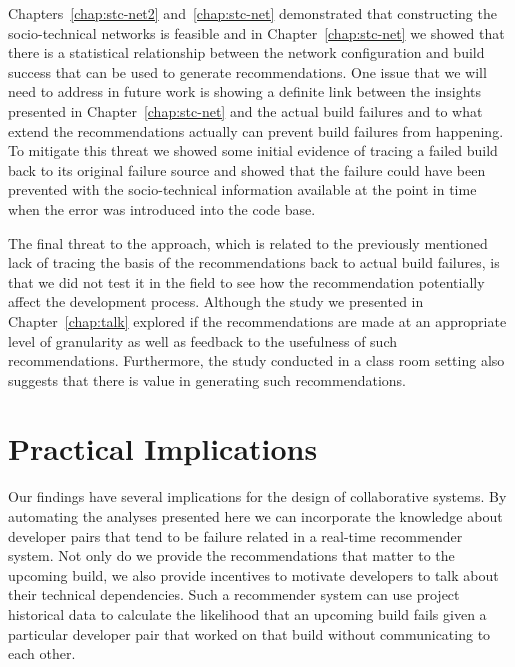 Chapters~\ref{chap:stc-net2} and~\ref{chap:stc-net} demonstrated that constructing the socio-technical networks is feasible and in Chapter~\ref{chap:stc-net} we showed that there is a statistical relationship between the network configuration and build success that can be used to generate recommendations.
One issue that we will need to address in future work is showing a definite link between the insights presented in Chapter~\ref{chap:stc-net} and the actual build failures and to what extend the recommendations actually can prevent build failures from happening.
To mitigate this threat we showed some initial evidence of tracing a failed build back to its original failure source and showed that the failure could have been prevented with the socio-technical information available at the point in time when the error was introduced into the code base.

The final threat to the approach, which is related to the previously mentioned lack of tracing the basis of the recommendations back to actual build failures, is that we did not test it in the field to see how the recommendation potentially affect the development process.
Although the study we presented in Chapter~\ref{chap:talk} explored if the recommendations are made at an appropriate level of granularity as well as feedback to the usefulness of such recommendations.
Furthermore, the study conducted in a class room setting also suggests that there is value in generating such recommendations.

\section{Practical Implications}
\label{sec:implications}
Our findings have several implications for the design of collaborative systems.
By automating the analyses presented here we can incorporate the knowledge about
developer pairs that tend to be failure related in a real-time recommender
system. Not only do we provide the recommendations that matter to the upcoming
build, we also provide incentives to motivate developers to talk about their
technical dependencies. 
%
Such a recommender system can use project historical data to
calculate the likelihood that an upcoming build fails given a particular
developer pair that worked on that build without communicating to each other.

